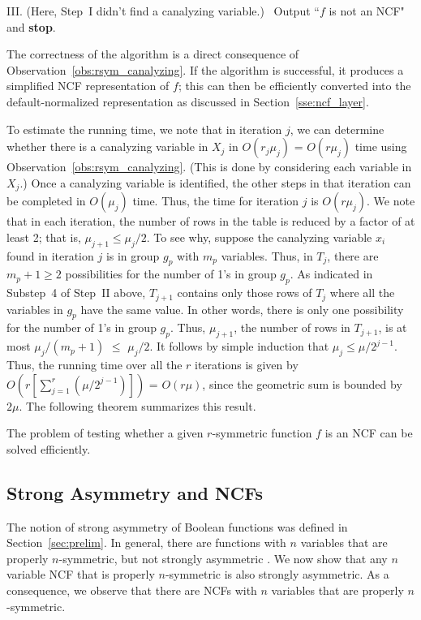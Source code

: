\smallskip
\noindent
III. (Here, Step~I didn't find a canalyzing variable.)~ 
Output ``$f$ is not an NCF" and \textbf{stop}.

\medskip
\noindent
The correctness of the algorithm is a direct consequence of
Observation~\ref{obs:rsym_canalyzing}. If the algorithm is successful,
it produces a simplified NCF representation of $f$; this can then be
efficiently converted into the default-normalized representation as
discussed in Section~\ref{sse:ncf_layer}.

To estimate the running time, we note that in iteration $j$, we can
determine whether there is a canalyzing variable in $X_j$
in $O(r_j \mu_j)$ = $O(r \mu_j)$ time using 
Observation~\ref{obs:rsym_canalyzing}.
(This is done by considering each variable in $X_j$.)
Once a canalyzing variable is identified, the other steps in that iteration
can be completed in $O(\mu_j)$ time.
Thus, the time for iteration $j$ is $O(r \mu_j)$.
We note that in each iteration, the number of rows in the table
is reduced by a factor of at least 2; that is, $\mu_{j+1} \leq \mu_j/2$.
To see why, suppose the canalyzing variable $x_i$ found in iteration $j$
is in group $g_p$ with $m_p$ variables. 
Thus, in $T_j$, there are $m_p+1 \geq 2$ possibilities for the number of 1's 
in group $g_p$. 
As indicated in Substep~4 of Step~II above, $T_{j+1}$ 
contains only those rows of $T_j$ where all the variables 
in $g_p$ have the same value.
In other words, there is only one possibility for the number of
1's in group $g_p$.
Thus, $\mu_{j+1}$, the number of rows in $T_{j+1}$,
is at most $\mu_j/(m_p+1)$ $\leq$ $\mu_j/2$.
It follows by simple induction that $\mu_j \leq \mu/2^{j-1}$.
Thus, the running time over all the $r$ iterations is given by
$O(r [\sum_{j=1}^{r}(\mu/2^{j-1})])$ = $O(r\mu)$, since the
geometric sum is bounded by $2\mu$.
The following theorem summarizes this result. 

\begin{theorem}\label{thm:rsym_canalyzing}
The problem of testing whether a given 
$r$-symmetric function $f$ is an NCF can 
be solved efficiently. \QED
\end{theorem}

\subsection{Strong Asymmetry and NCFs}
\label{sse:strong_asym_ncf}

The notion of strong asymmetry of Boolean functions was defined 
in Section~\ref{sec:prelim}.
In general, there are functions with $n$ variables that are properly
$n$-symmetric, but not strongly asymmetric \cite{KS-2000}.
We now show that any $n$ variable NCF that is properly $n$-symmetric
is also strongly asymmetric.
As a consequence, we observe that there are NCFs with $n$ variables
that are properly $n$-symmetric.

